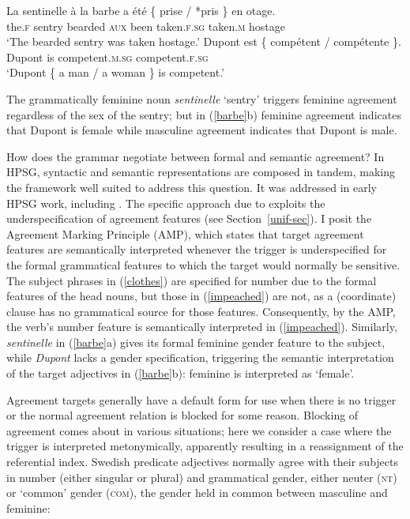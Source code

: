 \documentclass[output=paper
                ,modfonts
                ,nonflat
	        ,collection
	        ,collectionchapter
	        ,collectiontoclongg
 	        ,biblatex
                ,babelshorthands
                ,newtxmath
                ,draftmode
                ,colorlinks, citecolor=brown
]{./langsci/langscibook}
\begin{document}
{\begin{exe} 
\ex \label{barbe}
 \begin{xlist}
\ex   
\gll   La sentinelle	{\`{a} la barbe}	a \'{e}t\'{e}	\{ prise / *pris \} 	{en otage}.  \\
		the.\textsc{f} sentry	bearded	\textsc{aux} been	
		{} taken.\textsc{f.sg} {} taken.\textsc{m}	 {} hostage \\
\glt		`The bearded sentry was taken hostage.’
\ex   
\gll   Dupont	est	\{ comp\'{e}tent /		comp\'{e}tente \}. \\
		Dupont	is	{} competent.\textsc{m.sg} {}	competent.\textsc{f.sg} {} \\
\glt		`Dupont \{ a man / a woman \} is competent.’
 \end{xlist}
\end{exe} 

\noindent
The grammatically feminine noun \textit{sentinelle} `sentry'  triggers feminine agreement regardless of the sex of the sentry; but in (\ref{barbe}b) feminine agreement indicates that Dupont is female while masculine agreement indicates that Dupont is male.  

How does the grammar negotiate between formal and semantic agreement?  In HPSG, syntactic and semantic representations are composed in tandem, making the framework well suited to address this question.   It was addressed in early HPSG work, including \cite[Chapter~1]{Pollard+Sag:1994}.   The specific approach due to \cite{Wechsler:2011} exploits the underspecification of agreement features (see Section~\ref{unif-sec}).  I posit the Agreement Marking Principle (AMP), which states that target agreement features are semantically interpreted whenever the trigger is underspecified for the formal grammatical features to which the target would normally be sensitive.   The subject phrases in (\ref{clothes}) are specified for number due to the formal features of the head nouns, but those in (\ref{impeached}) are not, as a (coordinate) clause has no grammatical source for those features.  Consequently, by the AMP, the verb's number feature is semantically interpreted in (\ref{impeached}).  Similarly, \textit{sentinelle} in (\ref{barbe}a) gives its formal feminine gender feature to the subject, while \textit{Dupont} lacks a gender specification, triggering the semantic interpretation of the target adjectives in (\ref{barbe}b): feminine is interpreted as `female'.    

Agreement targets generally have a default form for use when there is no trigger or the normal agreement relation is blocked for some reason.   
Blocking of agreement comes about in various situations; here we  consider a case where the trigger is interpreted metonymically,  apparently resulting in a reassignment of the referential index.  Swedish predicate adjectives normally agree with their subjects in number (either singular or plural) and grammatical gender, either neuter (\textsc{nt}) or `common' gender (\textsc{com}), the gender held in common between masculine and feminine: 

}
\end{document}
